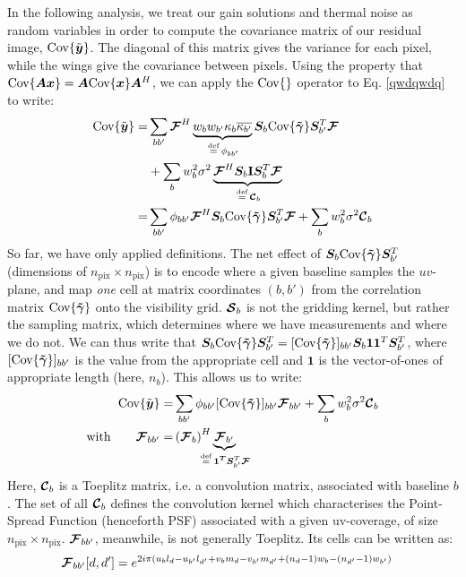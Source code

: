 \pg
In the following analysis, we treat our gain solutions and thermal noise as random variables in order to
compute the covariance matrix of our residual image, $\textrm{Cov}\{\tilde{\bm{{{y}}}}\}$. The diagonal of this matrix gives the variance for each pixel, while the wings give the covariance between pixels. Using the property that $\textrm{Cov}\{\bm{A}\bm{x}\} = \bm{A}\textrm{Cov}\{\bm{x}\}\bm{A}^H$, we can apply the $\textrm{Cov}\{\}$ operator to Eq. \ref{qwdqwdq} to write:
\begin{align}
\Cov{\muely} =& \sum_{bb'} \muelF^H \underbrace{w_b w_{b'} \kappa_b \overline{\kappa_{b'}}}_{\bydefn \phi_{bb'}} \matS_b \Cov{\matGains} \matS_{b'}^T \muelF\\
              &+ \sum_b w_b^2 \sigma^2 \underbrace{\muelF^H \matS_b \I \matS_b^T \muelF}_{\bydefn\muelC_b}\\
             =&  \sum_{bb'} \phi_{bb'} \muelF^H\matS_b \Cov{\matGains} \matS_{b'}^T \muelF + \sum_b w_b^2 \sigma^2 \muelC_b
\end{align}
So far, we have only applied definitions. The net effect of $\bm{S}_b \textrm{Cov}\{\bm{\tilde{\gamma}}\} \bm{S}_{b'}^T$ (dimensions of $n_{\mathrm{pix}}\times n_{\mathrm{pix}}$) is to encode where a given baseline samples the $uv$-plane, and map {\emph{one} cell at matrix coordinates $(b,b')$} from the correlation matrix $\textrm{Cov}\{\bm{\tilde{\gamma}}\}$ onto the visibility grid. $\bm{\mathcal{S}}_b$ is not the gridding kernel, but rather the sampling matrix, which determines where we have measurements and where we do not. We can thus write that $\bm{S}_b \textrm{Cov}\{\bm{\tilde{\gamma}}\} \bm{S}_{b'}^T=[\textrm{Cov}\{\bm{\tilde{\gamma}}\}]_{bb'} \bm{S}_b \bm{1} \bm{1}^T \bm{S}_{b'}^T$, where $[\textrm{Cov}\{\bm{\tilde{\gamma}}\}]_{bb'}$ is the value from the appropriate cell and $\bm{1}$ is the vector-of-ones of appropriate length (here, $n_b$). This allows us to write:
\begin{align}
\Cov{\muely} =& \sum_{bb'} \phi_{bb'} [\Cov{\matGains}]_{bb'} \muelF_{bb'} + \sum_b w_b^2 \sigma^2 \muelC_b\\
\mathrm{with}\qquad \muelF_{bb'} =& \left(\muelF_b\right)^H \underbrace{\muelF_{b'}}_{\mathclap{\bydefn \bm{1^T}\matS_{b'}^T\muelF}}
\end{align}
Here, $\bm{\mathcal{C}}_b$ is a Toeplitz matrix, i.e. a convolution matrix, associated with baseline $b$. The set of all $\bm{\mathcal{C}}_b$ defines the convolution kernel which characterises the Point-Spread Function (henceforth PSF) associated with a given uv-coverage, of size $n_{\mathrm{pix}}\times n_{\mathrm{pix}}$. $\bm{\mathcal{F}}_{bb'}$, meanwhile, is not {generally} Toeplitz. Its cells can be written as:
\begin{align}
\bm{\mathcal{F}}_{bb'}[d,d'] &= e^{2i\pi  \left(u_b l_d - u_{b'} l_{d'} + v_b m_d - v_{b'} m_{d'} + \left(n_d-1\right)w_b -\left(n_{d'}-1\right) w_{b'}\right)}
\end{align}
